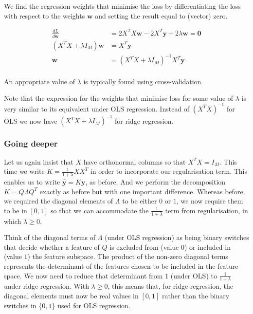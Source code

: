 \documentclass[11pt]{article}
\begin{document}
	We find the regression weights that minimise the loss by differentiating the loss with respect to the weights $\boldsymbol{w}$ and setting the result equal to (vector) zero.
	
	\begin{align*}
		\frac{dL}{d\boldsymbol{w}} &= 2X^{T}X \boldsymbol{w} - 2X^{T} \boldsymbol{y} + 2 \lambda \boldsymbol{w} = \boldsymbol{0} \\
		(X^{T}X + \lambda I_{M}) \boldsymbol{w} &= X^{T} \boldsymbol{y} \\
		\boldsymbol{w} &= (X^{T}X + \lambda I_{M})^{-1}X^{T} \boldsymbol{y} \\
	\end{align*}
	
	An appropriate value of $\lambda$ is typically found using cross-validation.
	
	Note that the expression for the weights that minimise loss for some value of $\lambda$ is very similar to its equivalent under OLS regression. Instead of $(X^{T}X)^{-1}$ for OLS we now have $(X^{T}X + \lambda I_{M})^{-1}$ for ridge regression.
	
	\subsubsection{Going deeper}
	
	Let us again insist that $X$ have orthonormal columns so that $X^{T}X = I_{M}$. This time we write $K = \frac{1}{1 + \lambda}XX^{T}$ in order to incorporate our regularisation term. This enables us to write $\boldsymbol{\hat{y}} = K\boldsymbol{y}$, as before. And we perform the decomposition $K = Q \Lambda Q^{T}$ exactly as before but with one important difference. Whereas before, we required the diagonal elements of $\Lambda$ to be either $0$ or $1$, we now require them to be in $[0, 1]$ so that we can accommodate the $\frac{1}{1 + \lambda}$ term from regularisation, in which $\lambda \geq 0$. 
	
	Think of the diagonal terms of $\Lambda$ (under OLS regression) as being binary switches that decide whether a feature of $Q$ is excluded from (value $0$) or included in (value $1$) the feature subspace. The product of the non-zero diagonal terms represents the determinant of the features chosen to be included in the feature space. We now need to reduce that determinant from $1$ (under OLS) to $\frac{1}{1 + \lambda}$ under ridge regression. With $\lambda \geq 0$, this means that, for ridge regression, the diagonal elements must now be real values in $[0, 1]$ rather than the binary switches in $\{0, 1\}$ used for OLS regression.
	
\end{document}
